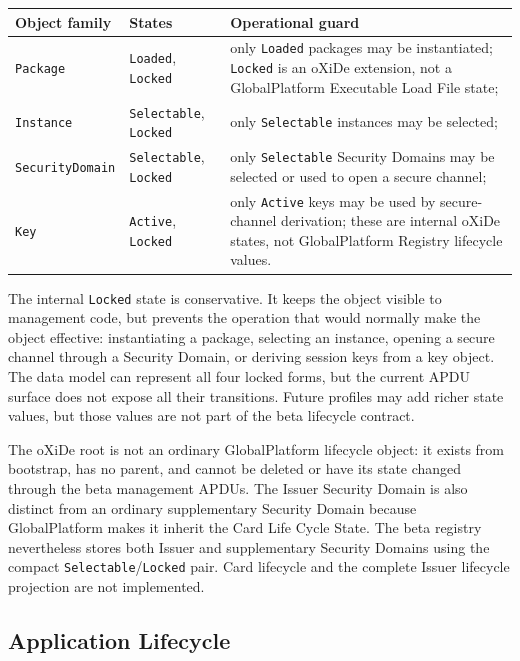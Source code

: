 \begin{center}
\begin{tabular}{p{}p{}p{}}
\textbf{Object family} & \textbf{States} & \textbf{Operational guard} \\
\hline
\texttt{Package} & \texttt{Loaded}, \texttt{Locked} &
  only \texttt{Loaded} packages may be instantiated; \texttt{Locked} is an
  oXiDe extension, not a GlobalPlatform Executable Load File state; \\
\texttt{Instance} & \texttt{Selectable}, \texttt{Locked} &
  only \texttt{Selectable} instances may be selected; \\
\texttt{SecurityDomain} & \texttt{Selectable}, \texttt{Locked} &
  only \texttt{Selectable} Security Domains may be selected or used to open a
  secure channel; \\
\texttt{Key} & \texttt{Active}, \texttt{Locked} &
  only \texttt{Active} keys may be used by secure-channel derivation; these are
  internal oXiDe states, not GlobalPlatform Registry lifecycle values.
\end{tabular}
\end{center}

The internal \texttt{Locked} state is conservative. It keeps the object
visible to management code, but prevents the operation that would normally
make the object effective: instantiating a package, selecting an instance,
opening a secure channel through a Security Domain, or deriving session keys
from a key object. The data model can represent all four locked forms, but the
current APDU surface does not expose all their transitions. Future profiles
may add richer state values, but those values are not part of the beta
lifecycle contract.

The oXiDe root is not an ordinary GlobalPlatform lifecycle object: it exists
from bootstrap, has no parent, and cannot be deleted or have its state changed
through the beta management APDUs. The Issuer Security Domain is also distinct
from an ordinary supplementary Security Domain because GlobalPlatform makes it
inherit the Card Life Cycle State. The beta registry nevertheless stores both
Issuer and supplementary Security Domains using the compact
\texttt{Selectable}/\texttt{Locked} pair. Card lifecycle and the complete
Issuer lifecycle projection are not implemented.

\subsection{Application Lifecycle}
\label{sec:gp-lifecycle-application}

